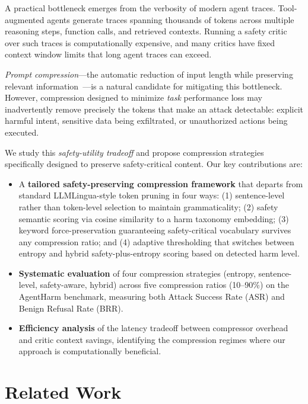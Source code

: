 \documentclass[11pt]{article}
\begin{document}
A practical bottleneck emerges from the verbosity of modern agent traces. Tool-augmented agents generate traces spanning thousands of tokens across multiple reasoning steps, function calls, and retrieved contexts. Running a safety critic over such traces is computationally expensive, and many critics have fixed context window limits that long agent traces can exceed.

\textit{Prompt compression}---the automatic reduction of input length while preserving relevant information~\cite{jiang2023llmlingua,pan2024llmlingua2}---is a natural candidate for mitigating this bottleneck. However, compression designed to minimize \textit{task} performance loss may inadvertently remove precisely the tokens that make an attack detectable: explicit harmful intent, sensitive data being exfiltrated, or unauthorized actions being executed.

We study this \textit{safety-utility tradeoff} and propose compression strategies specifically designed to preserve safety-critical content. Our key contributions are:

\begin{itemize}
    \item A \textbf{tailored safety-preserving compression framework} that departs from standard LLMLingua-style token pruning in four ways: (1) sentence-level rather than token-level selection to maintain grammaticality; (2) safety semantic scoring via cosine similarity to a harm taxonomy embedding; (3) keyword force-preservation guaranteeing safety-critical vocabulary survives any compression ratio; and (4) adaptive thresholding that switches between entropy and hybrid safety-plus-entropy scoring based on detected harm level.
    \item \textbf{Systematic evaluation} of four compression strategies (entropy, sentence-level, safety-aware, hybrid) across five compression ratios (10--90\%) on the AgentHarm benchmark, measuring both Attack Success Rate (ASR) and Benign Refusal Rate (BRR).
    \item \textbf{Efficiency analysis} of the latency tradeoff between compressor overhead and critic context savings, identifying the compression regimes where our approach is computationally beneficial.
\end{itemize}

\section{Related Work}
\end{document}
